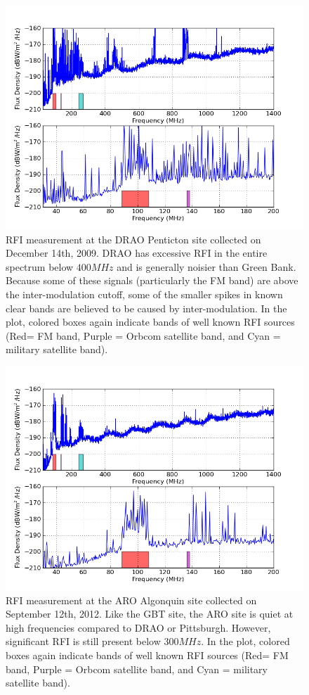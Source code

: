 \begin{figure}[htb]
\begin{center}
\includegraphics[width=0.9\linewidth]{RFI_testing/figures/DRAO_bands.png}
\caption{RFI measurement at the DRAO Penticton site collected on December 14th, 2009. DRAO has excessive RFI in the entire spectrum below $400 MHz$ and is generally noisier than Green Bank. Because some of these signals (particularly the FM band) are above the inter-modulation cutoff, some of the smaller spikes in known clear bands are believed to be caused by inter-modulation. In the plot, colored boxes again indicate bands of well known RFI sources (Red= FM band, Purple = Orbcom satellite band, and Cyan = military satellite band).   }
\label{Fig:draorfi}
\end{center}
\end{figure}

\begin{figure}[tb]
\begin{center}
\includegraphics[width=0.9\linewidth]{RFI_testing/figures/ALG_bands.png}
\caption{RFI measurement at the ARO Algonquin site collected on September 12th, 2012. Like the GBT site, the ARO site is quiet at high frequencies compared to DRAO or Pittsburgh. However, significant RFI is still present below $300 MHz$. In the plot, colored boxes again indicate bands of well known RFI sources (Red= FM band, Purple = Orbcom satellite band, and Cyan = military satellite band).}
\label{Fig:arorfi}
\end{center}
\end{figure}


